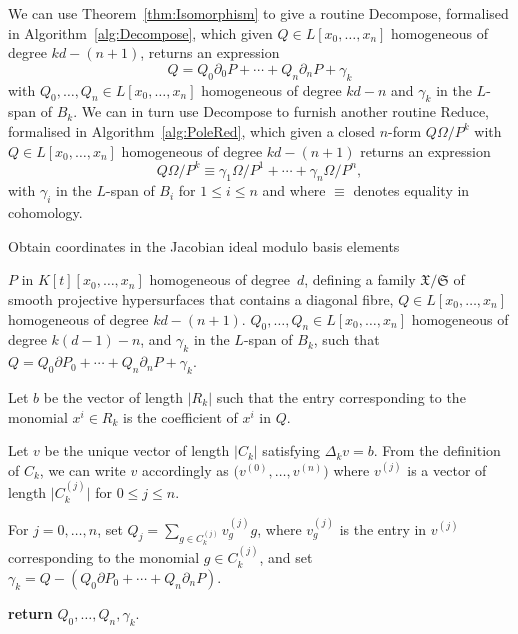 \documentclass[a4paper,11pt]{article}
\numberwithin{equation}{section}
\providecommand{\abs}[1]{\lvert#1\rvert}                 %
\theoremstyle{definition}
\begin{document}
We can use Theorem~\ref{thm:Isomorphism} to give a routine {\sc Decompose}, 
formalised in Algorithm~\ref{alg:Decompose}, which given 
$Q \in L[x_0, \dotsc, x_n]$ homogeneous of degree $kd - (n+1)$, 
returns an expression 
\begin{equation}
Q = Q_0 \partial_0 P + \dotsb + Q_n \partial_n P + \gamma_k
\end{equation} 
with $Q_0, \dotsc, Q_n \in L[x_0, \dotsc, x_n]$ homogeneous of 
degree $kd-n$ and $\gamma_k$ in the $L$-span of $B_k$. We can in turn 
use {\sc Decompose} to furnish another routine {\sc Reduce}, formalised 
in Algorithm~\ref{alg:PoleRed}, which given a closed $n$-form $Q\Omega/P^k$ 
with $Q \in L[x_0, \dotsc, x_n]$ homogeneous of degree $kd - (n+1)$ returns 
an expression
\begin{equation}
Q \Omega / P^k \equiv \gamma_{1} \Omega / P^{1} + \dotsb + \gamma_n \Omega / P^n,
\end{equation}
with $\gamma_i$ in the $L$-span of $B_i$ for $1 \leq i \leq n$ and 
where $\equiv$ denotes equality in cohomology.

\begin{algorithm}[ht]
\caption{Obtain coordinates in the Jacobian ideal modulo basis elements}
\label{alg:Decompose}
\begin{algorithmic}
\Require  $P$ in $K[t][x_0, \dotsc, x_n]$ homogeneous of degree~$d$, 
         defining a family $\mathfrak{X}/\mathfrak{S}$ of smooth projective 
         hypersurfaces that contains a diagonal fibre, $Q \in L[x_0, \dotsc, x_n]$ homogeneous of degree $kd - (n+1)$.
\Ensure  $Q_0, \dotsc, Q_n \in L[x_0, \dotsc, x_n]$ homogeneous of degree 
         $k(d-1)-n$, and $\gamma_k$ in the $L$-span of $B_k$, such that 
         $Q = Q_0 \partial P_0 + \dotsb + Q_n \partial_n P +\gamma_k$.
\State \begin{compactenum}[\it {Step} I.] \vspace{-1.24em}
\item Let $b$ be the vector of length $\abs{R_k}$ such that the entry 
      corresponding to the monomial $x^i \in R_k$ is the coefficient of 
      $x^i$ in $Q$.
\item Let $v$ be the unique vector of length $\abs{C_k}$ satisfying 
      $\Delta_k v = b$.  From the definition of $C_k$, we can write $v$ 
      accordingly as $\bigl(v^{(0)}, \dotsc, v^{(n)}\bigr)$ 
      where $v^{(j)}$ is a vector of length $\abs{C_k^{(j)}}$ 
      for $0 \leq j \leq n$.
\item For $j = 0, \dotsc, n$, set $Q_j = \sum_{g \in C_k^{(j)}} v_g^{(j)} g$,
      where $v_g^{(j)}$ is the entry in $v^{(j)}$ corresponding to the 
      monomial $g \in C_k^{(j)}$, and set $\gamma_k = Q-(Q_0 \partial P_0 + \dotsb + Q_n \partial_n P)$.
\item \textbf{return} $Q_0, \dotsc, Q_n,\gamma_k$.
\end{compactenum}
\EndProcedure
\end{algorithmic}
\end{algorithm}
\end{document}
